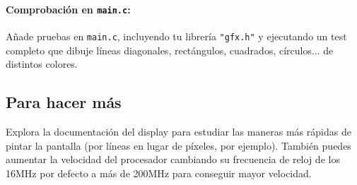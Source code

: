 \documentclass[../main.tex]{subfiles}
\begin{document}
            \paragraph{Comprobación en \texttt{main.c}:}
                Añade pruebas en \texttt{main.c}, incluyendo tu librería \texttt{"gfx.h"} y ejecutando un test completo que dibuje líneas diagonales, rectángulos, cuadrados, círculos... de distintos colores.
    
    \subsection{Para hacer más} 
        
        Explora la documentación del display para estudiar las maneras más rápidas de pintar la pantalla (por líneas en lugar de píxeles, por ejemplo). También puedes aumentar la velocidad del procesador cambiando su frecuencia de reloj de los 16MHz por defecto a más de 200MHz para conseguir mayor velocidad.
\end{document}
